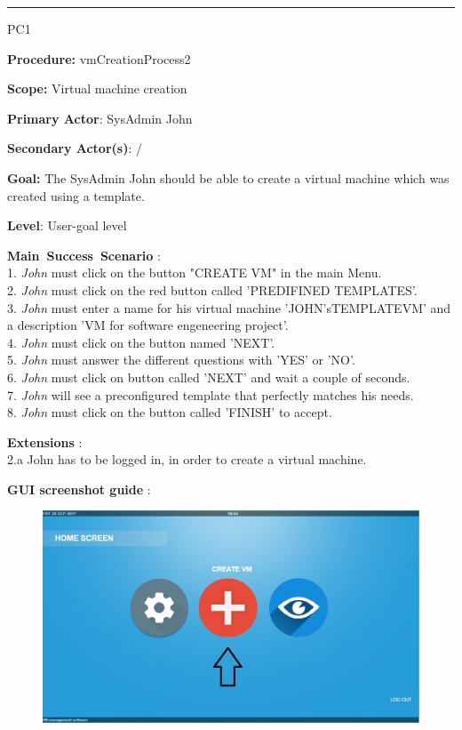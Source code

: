 \hrule
\vspace{0.5cm}
\begin{lyxlist}{PC1}
\small{
\item [\textbf{Procedure:}] vmCreationProcess2
\item [\textbf{Scope:}] Virtual machine creation
\item [\textbf{Primary Actor}:] SysAdmin John 
\item [\textbf{Secondary Actor(s)}:] /
\item [\textbf{Goal:}] The SysAdmin John should be able to create a virtual
machine which was created using a template.
\item [\textbf{Level}:] User-goal level
\item [\textbf{Main~Success~Scenario}]:\\
1. \emph{John} must click on the button "CREATE VM" in the main
Menu.\\
2. \emph{John} must click on the red button called 'PREDIFINED TEMPLATES'.\\ 
3. \emph{John} must enter a name for his virtual machine 'JOHN'sTEMPLATEVM' and
a description 'VM for software engeneering project'.\\
4. \emph{John} must click on the button named 'NEXT'.\\
5. \emph{John} must answer the different questions with 'YES' or 'NO'.\\
6. \emph{John} must click on button called 'NEXT' and wait a couple of
seconds.\\
7. \emph{John} will see a preconfigured template that perfectly
matches his needs.\\
8. \emph{John} must click on the button called 'FINISH' to accept.\\


\item [\textbf{Extensions}]:\\
2.a John has to be logged in, in order to create a virtual machine.

\item [\textbf{GUI screenshot guide}]:\\
}

\begin{figure}[H]
\centering
\includegraphics[width=170mm]{images/createVMEx1.eps}
\caption{\label{overflow}}
\end{figure}



\end{lyxlist}
